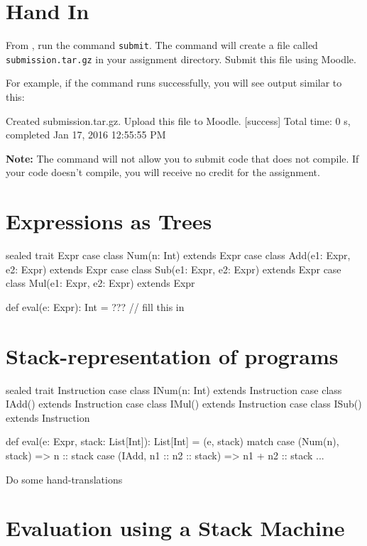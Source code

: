 \documentclass{book}
\begin{document}
\section{Hand In}

From \sbt{}, run the command \verb|submit|. The command will create
a file called \verb|submission.tar.gz| in your assignment directory.
Submit this file using Moodle.

For example, if the command runs successfully, you will see output similar
to this:
%
\begin{console}
Created submission.tar.gz. Upload this file to Moodle.
[success] Total time: 0 s, completed Jan 17, 2016 12:55:55 PM
\end{console}

\textbf{Note:}  The command will not allow you to submit code that does not
compile. If your code doesn't compile, you will receive no credit for the
assignment.

\newlecture


\section{Expressions as Trees}

\begin{scalacode}
sealed trait Expr
case class Num(n: Int) extends Expr
case class Add(e1: Expr, e2: Expr) extends Expr
case class Sub(e1: Expr, e2: Expr) extends Expr
case class Mul(e1: Expr, e2: Expr) extends Expr

def eval(e: Expr): Int = ??? // fill this in
\end{scalacode}

\section{Stack-representation of programs}

\begin{scalacode}
sealed trait Instruction
case class INum(n: Int) extends Instruction
case class IAdd() extends Instruction
case class IMul() extends Instruction
case class ISub() extends Instruction

def eval(e: Expr, stack: List[Int]): List[Int] = (e, stack) match {
  case (Num(n), stack) => n :: stack
  case (IAdd, n1 :: n2 :: stack) => n1 + n2 :: stack
  ...
}
\end{scalacode}

Do some hand-translations

\section{Evaluation using a Stack Machine}
\end{document}
